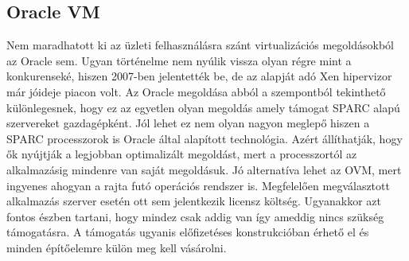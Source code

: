 \documentclass[12pt,oneside,justify,table]{book}
\begin{document}
\subsection{Oracle\textsuperscript{\textregistered} VM}
Nem maradhatott ki az üzleti felhasználásra szánt virtualizációs megoldásokból az Oracle sem. Ugyan történelme nem nyúlik vissza olyan régre mint a konkurenseké, hiszen 2007-ben jelentették be, de az alapját adó Xen hipervizor már jóideje piacon volt. Az Oracle megoldása abból a szempontból tekinthető különlegesnek, hogy ez az egyetlen olyan megoldás amely támogat SPARC alapú szervereket gazdagépként. Jól lehet ez nem olyan nagyon meglepő hiszen a SPARC processzorok is Oracle által alapított technológia. Azért állíthatják, hogy ők nyújtják a legjobban optimalizált megoldást, mert a processzortól az alkalmazásig mindenre van saját megoldásuk. Jó alternatíva lehet az OVM, mert ingyenes ahogyan a rajta futó operációs rendszer is. Megfelelően megválasztott alkalmazás szerver esetén ott sem jelentkezik licensz költség. Ugyanakkor azt fontos észben tartani, hogy mindez csak addig van így ameddig nincs szükség támogatásra. A támogatás ugyanis előfizetéses konstrukcióban érhető el és minden építőelemre külön meg kell vásárolni. \\
\end{document}
